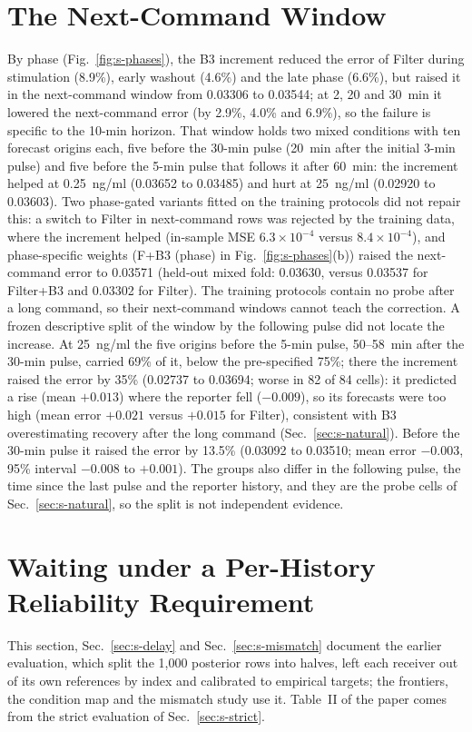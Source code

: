 \documentclass[conference]{IEEEtran}
\newcommand{\pr}[1]{\textsf{#1}}
\begin{document}
\section{The Next-Command Window}
\label{sec:s-nextcmd}
By phase (Fig.~\ref{fig:s-phases}), the B3 increment reduced the error of \pr{Filter} during stimulation (8.9\%), early washout (4.6\%) and the late phase (6.6\%), but raised it in the next-command window from 0.03306 to 0.03544; at 2, 20 and 30~min it lowered the next-command error (by 2.9\%, 4.0\% and 6.9\%), so the failure is specific to the 10-min horizon. That window holds two mixed conditions with ten forecast origins each, five before the 30-min pulse (20~min after the initial 3-min pulse) and five before the 5-min pulse that follows it after 60~min: the increment helped at 0.25~ng/ml (0.03652 to 0.03485) and hurt at 25~ng/ml (0.02920 to 0.03603). Two phase-gated variants fitted on the training protocols did not repair this: a switch to \pr{Filter} in next-command rows was rejected by the training data, where the increment helped (in-sample MSE $6.3\times10^{-4}$ versus $8.4\times10^{-4}$), and phase-specific weights (\pr{F+B3 (phase)} in Fig.~\ref{fig:s-phases}(b)) raised the next-command error to 0.03571 (held-out mixed fold: 0.03630, versus 0.03537 for \pr{Filter+B3} and 0.03302 for \pr{Filter}). The training protocols contain no probe after a long command, so their next-command windows cannot teach the correction. A frozen descriptive split of the window by the following pulse did not locate the increase. At 25~ng/ml the five origins before the 5-min pulse, 50--58~min after the 30-min pulse, carried 69\% of it, below the pre-specified 75\%; there the increment raised the error by 35\% (0.02737 to 0.03694; worse in 82 of 84 cells): it predicted a rise (mean $+0.013$) where the reporter fell ($-0.009$), so its forecasts were too high (mean error $+0.021$ versus $+0.015$ for \pr{Filter}), consistent with B3 overestimating recovery after the long command (Sec.~\ref{sec:s-natural}). Before the 30-min pulse it raised the error by 13.5\% (0.03092 to 0.03510; mean error $-0.003$, 95\% interval $-0.008$ to $+0.001$). The groups also differ in the following pulse, the time since the last pulse and the reporter history, and they are the probe cells of Sec.~\ref{sec:s-natural}, so the split is not independent evidence.

\section{Waiting under a Per-History Reliability Requirement}
\label{sec:s-waiting}
This section, Sec.~\ref{sec:s-delay} and Sec.~\ref{sec:s-mismatch} document the earlier evaluation, which split the 1,000 posterior rows into halves, left each receiver out of its own references by index and calibrated to empirical targets; the frontiers, the condition map and the mismatch study use it. Table~II of the paper comes from the strict evaluation of Sec.~\ref{sec:s-strict}.
\end{document}
